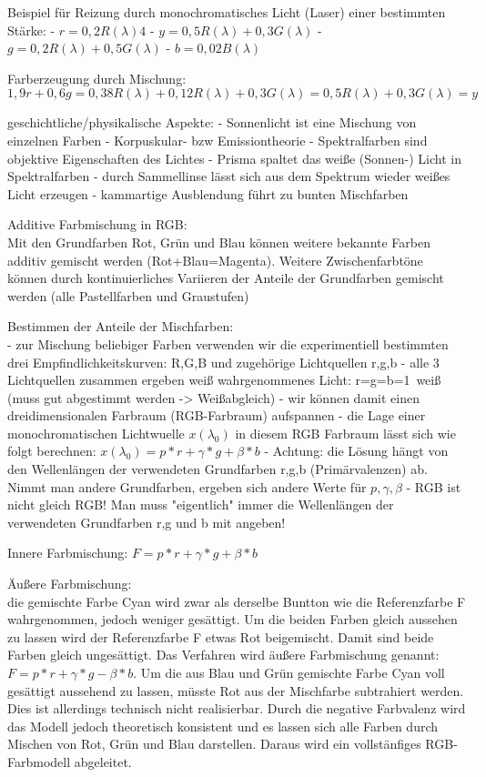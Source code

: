 \documentclass[10pt,landscape]{article}
\begin{document}
\begin{multicols}{3}
Beispiel für Reizung durch monochromatisches Licht (Laser) einer bestimmten Stärke:
- $r=0,2R(\lambda)4$
- $y=0,5R(\lambda)+0,3G(\lambda)$
- $g=0,2R(\lambda)+0,5G(\lambda)$
- $b=0,02B(\lambda)$

Farberzeugung durch Mischung:
$$1,9r + 0,6g = 0,38R(\lambda)+0,12R(\lambda)+0,3G(\lambda)=0,5R(\lambda)+0,3G(\lambda) = y$$

geschichtliche/physikalische Aspekte:
- Sonnenlicht ist eine Mischung von einzelnen Farben
- Korpuskular- bzw Emissiontheorie
- Spektralfarben sind objektive Eigenschaften des Lichtes
- Prisma spaltet das weiße (Sonnen-) Licht in Spektralfarben
- durch Sammellinse lässt sich aus dem Spektrum wieder weißes Licht erzeugen
- kammartige Ausblendung führt zu bunten Mischfarben

Additive Farbmischung in RGB:\\
Mit den Grundfarben Rot, Grün und Blau können weitere bekannte Farben additiv gemischt werden (Rot+Blau=Magenta). Weitere Zwischenfarbtöne können durch kontinuierliches Variieren der Anteile der Grundfarben gemischt werden (alle Pastellfarben und Graustufen)

Bestimmen der Anteile der Mischfarben:\\
- zur Mischung beliebiger Farben verwenden wir die experimentiell bestimmten drei Empfindlichkeitskurven: R,G,B und zugehörige Lichtquellen r,g,b
- alle 3 Lichtquellen zusammen ergeben weiß wahrgenommenes Licht: r=g=b=1~weiß (muss gut abgestimmt werden -> Weißabgleich)
- wir können damit einen dreidimensionalen Farbraum (RGB-Farbraum) aufspannen
- die Lage einer monochromatischen Lichtwuelle $x(\lambda_0)$ in diesem RGB Farbraum lässt sich wie folgt berechnen: $x(\lambda_0)=p*r+\gamma*g+\beta*b$
- Achtung: die Lösung hängt von den Wellenlängen der verwendeten Grundfarben r,g,b (Primärvalenzen) ab. Nimmt man andere Grundfarben, ergeben sich andere Werte für $p,\gamma,\beta$
- RGB ist nicht gleich RGB! Man muss "eigentlich" immer die Wellenlängen der verwendeten Grundfarben r,g und b mit angeben!

Innere Farbmischung: $F=p*r + \gamma*g + \beta*b$

Äußere Farbmischung:\\
die gemischte Farbe Cyan wird zwar als derselbe Buntton wie die Referenzfarbe F wahrgenommen, jedoch weniger gesättigt. Um die beiden Farben gleich aussehen zu lassen wird der Referenzfarbe F etwas Rot beigemischt. Damit sind beide Farben gleich ungesättigt. Das Verfahren wird äußere Farbmischung genannt: $F=p*r + \gamma *g - \beta *b$.
Um die aus Blau und Grün gemischte Farbe Cyan voll gesättigt aussehend zu lassen, müsste Rot aus der Mischfarbe subtrahiert werden. Dies ist allerdings technisch nicht realisierbar. Durch die negative Farbvalenz wird das Modell jedoch theoretisch konsistent und es lassen sich alle Farben durch Mischen von Rot, Grün und Blau darstellen. Daraus wird ein vollstänfiges RGB-Farbmodell abgeleitet.


\end{multicols}
\end{document}
